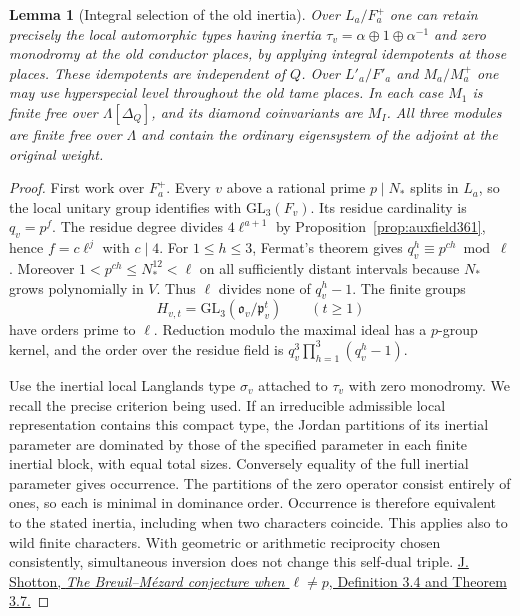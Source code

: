 \documentclass[a4paper,11pt]{article}
\newtheorem{lemma}[proposition]{Lemma}
\theoremstyle{definition}
\theoremstyle{remark}
\numberwithin{equation}{section}
\begin{document}
\begin{lemma}[Integral selection of the old inertia]\leavevmode
\label{lem:oldidempotent405}
Over \(L_a/F_a^+\) one can retain precisely the local
automorphic types having inertia
\(\tau_v=\alpha\oplus1\oplus\alpha^{-1}\) and zero monodromy
at the old conductor places, by applying integral idempotents
at those places. These idempotents are independent of \(Q\).
Over \(L'_a/F'_a\) and \(M_a/M_a^+\) one may use hyperspecial
level throughout the old tame places. In each case \(M_1\)
is finite free over \(\Lambda[\Delta_Q]\), and its diamond
coinvariants are \(M_I\). All three modules are finite free
over \(\Lambda\) and contain the ordinary eigensystem of the
adjoint at the original weight.
\end{lemma}
\begin{proof}
First work over \(F_a^+\). Every \(v\) above a rational prime
\(p\mid N_*\) splits in \(L_a\), so the local unitary group
identifies with \(\mathrm{GL}_3(F_v)\). Its residue cardinality
is \(q_v=p^f\). The residue degree divides \(4\ell^{a+1}\)
by Proposition~\ref{prop:auxfield361}, hence \(f=c\ell^j\)
with \(c\mid4\). For \(1\le h\le3\), Fermat's theorem gives
\(q_v^h\equiv p^{ch}\bmod\ell\). Moreover
\(1<p^{ch}\le N_*^{12}<\ell\) on all sufficiently distant
intervals because \(N_*\) grows polynomially in \(V\).
Thus \(\ell\) divides none of \(q_v^h-1\). The finite groups
\[
       H_{v,t}=\mathrm{GL}_3(\mathfrak o_v/\mathfrak p_v^t)
                      \qquad(t\ge1)
\]
have orders prime to \(\ell\). Reduction modulo the maximal
ideal has a \(p\)-group kernel, and the order over the residue
field is \(q_v^3\prod_{h=1}^3(q_v^h-1)\).

Use the inertial local Langlands type \(\sigma_v\) attached
to \(\tau_v\) with zero monodromy. We recall the precise
criterion being used. If an irreducible admissible local
representation contains this compact type, the Jordan
partitions of its inertial parameter are dominated by those
of the specified parameter in each finite inertial block,
with equal total sizes. Conversely equality of the full
inertial parameter gives occurrence. The partitions of the
zero operator consist entirely of ones, so each is minimal
in dominance order. Occurrence is therefore equivalent to
the stated inertia, including when two characters coincide.
This applies also to wild finite characters. With geometric or
arithmetic reciprocity chosen consistently, simultaneous
inversion does not change this self-dual triple.
\href{https://maths.dur.ac.uk/users/jack.g.shotton/papers/gln.pdf}{J. Shotton,
\emph{The Breuil--M\'ezard conjecture when \(\ell\ne p\)},
Definition 3.4 and Theorem 3.7.}


\end{proof}
\end{document}
